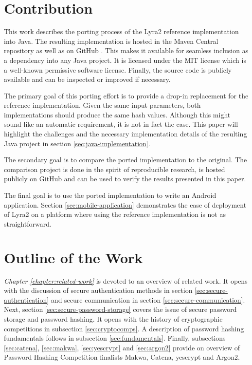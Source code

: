 \section{Contribution}
This work describes the porting process of the Lyra2 reference implementation into Java. The resulting implementation is hosted in the Maven Central repository \cite{maven:2017:lyra2} as well as on GitHub \cite{github:2017:lyra2-java}. This makes it available for seamless inclusion as a dependency into any Java project. It is licensed under the MIT license which is a well-known permissive software license. Finally, the source code is publicly available and can be inspected or improved if necessary.

The primary goal of this porting effort is to provide a drop-in replacement for the reference implementation. Given the same input parameters, both implementations should produce the same hash values. Although this might sound like an automatic requirement, it is not in fact the case. This paper will highlight the challenges and the necessary implementation details of the resulting Java project in section \ref{sec:java-implementation}.

The secondary goal is to compare the ported implementation to the original. The comparison project is done in the spirit of reproducible research, is hosted publicly on GitHub \cite{github:2017:lyra2-compare} and can be used to verify the results presented in this paper.

The final goal is to use the ported implementation to write an Android application. Section \ref{sec:mobile-application} demonstrates the ease of deployment of Lyra2 on a platform where using the reference implementation is not as straightforward.

\section{Outline of the Work}

\emph{Chapter \ref{chapter:related-work}} is devoted to an overview of related work. It opens with the discussion of secure authentication methods in section \ref{sec:secure-authentication} and secure communication in section \ref{sec:secure-communication}. Next, section \ref{sec:secure-password-storage} covers the issue of secure password storage and password hashing. It opens with the history of cryptographic competitions in subsection \ref{sec:cryptocomps}. A description of password hashing fundamentals follows in subsection \ref{sec:fundamentals}. Finally, subsections \ref{sec:catena}, \ref{sec:makwa}, \ref{sec:yescrypt} and \ref{sec:argon2} provide on overview of Password Hashing Competition finalists Makwa, Catena, yescrypt and Argon2.


